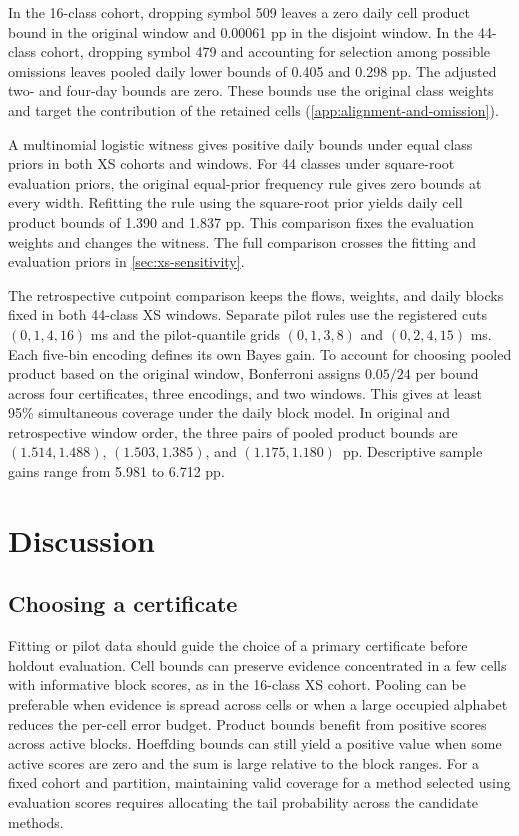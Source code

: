 \documentclass[preprint,11pt]{elsarticle}
\begin{document}
In the 16-class cohort, dropping symbol 509 leaves a zero daily cell product bound in the original window and 0.00061 pp in the disjoint window. In the 44-class cohort, dropping symbol 479 and accounting for selection among possible omissions leaves pooled daily lower bounds of 0.405 and 0.298 pp. The adjusted two- and four-day bounds are zero. These bounds use the original class weights and target the contribution of the retained cells (\ref{app:alignment-and-omission}).

A multinomial logistic witness gives positive daily bounds under equal class priors in both XS cohorts and windows. For 44 classes under square-root evaluation priors, the original equal-prior frequency rule gives zero bounds at every width. Refitting the rule using the square-root prior yields daily cell product bounds of 1.390 and 1.837 pp. This comparison fixes the evaluation weights and changes the witness. The full comparison crosses the fitting and evaluation priors in \ref{sec:xs-sensitivity}.

The retrospective cutpoint comparison keeps the flows, weights, and daily blocks fixed in both 44-class XS windows. Separate pilot rules use the registered cuts $(0,1,4,16)$ ms and the pilot-quantile grids $(0,1,3,8)$ and $(0,2,4,15)$ ms. Each five-bin encoding defines its own Bayes gain. To account for choosing pooled product based on the original window, Bonferroni assigns $0.05/24$ per bound across four certificates, three encodings, and two windows. This gives at least 95\% simultaneous coverage under the daily block model. In original and retrospective window order, the three pairs of pooled product bounds are $(1.514,1.488)$, $(1.503,1.385)$, and $(1.175,1.180)$~pp. Descriptive sample gains range from 5.981 to 6.712 pp.

\FloatBarrier

\section{Discussion}

\subsection{Choosing a certificate}

Fitting or pilot data should guide the choice of a primary certificate before holdout evaluation. Cell bounds can preserve evidence concentrated in a few cells with informative block scores, as in the 16-class XS cohort. Pooling can be preferable when evidence is spread across cells or when a large occupied alphabet reduces the per-cell error budget. Product bounds benefit from positive scores across active blocks. Hoeffding bounds can still yield a positive value when some active scores are zero and the sum is large relative to the block ranges. For a fixed cohort and partition, maintaining valid coverage for a method selected using evaluation scores requires allocating the tail probability across the candidate methods.
\end{document}
